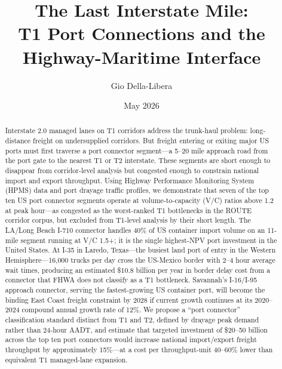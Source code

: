 \documentclass[12pt]{article}
\title{The Last Interstate Mile:\\
       T1 Port Connections and the Highway-Maritime Interface}
\author{Gio Della-Libera}
\date{May 2026}
\begin{document}
\maketitle
\begin{abstract}
Interstate 2.0 managed lanes on T1 corridors address the trunk-haul problem: long-distance freight on undersupplied corridors. But freight entering or exiting major US ports must first traverse a port connector segment---a 5--20 mile approach road from the port gate to the nearest T1 or T2 interstate. These segments are short enough to disappear from corridor-level analysis but congested enough to constrain national import and export throughput. Using Highway Performance Monitoring System (HPMS) data and port drayage traffic profiles, we demonstrate that seven of the top ten US port connector segments operate at volume-to-capacity (V/C) ratios above 1.2 at peak hour---as congested as the worst-ranked T1 bottlenecks in the ROUTE corridor corpus, but excluded from T1-level analysis by their short length. The LA/Long Beach I-710 connector handles 40\% of US container import volume on an 11-mile segment running at V/C 1.5+; it is the single highest-NPV port investment in the United States. At I-35 in Laredo, Texas---the busiest land port of entry in the Western Hemisphere---16,000 trucks per day cross the US-Mexico border with 2--4 hour average wait times, producing an estimated \$10.8 billion per year in border delay cost from a connector that FHWA does not classify as a T1 bottleneck. Savannah's I-16/I-95 approach connector, serving the fastest-growing US container port, will become the binding East Coast freight constraint by 2028 if current growth continues at its 2020--2024 compound annual growth rate of 12\%. We propose a ``port connector'' classification standard distinct from T1 and T2, defined by drayage peak demand rather than 24-hour AADT, and estimate that targeted investment of \$20--50 billion across the top ten port connectors would increase national import/export freight throughput by approximately 15\%---at a cost per throughput-unit 40--60\% lower than equivalent T1 managed-lane expansion.
\end{abstract}










\end{document}
